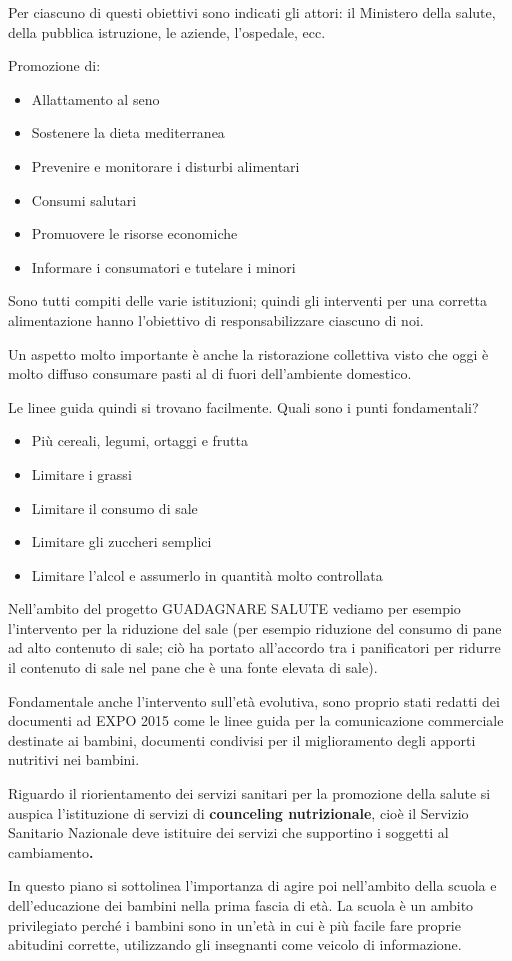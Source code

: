 Per ciascuno di questi obiettivi sono indicati gli attori: il Ministero
della salute, della pubblica istruzione, le aziende, l'ospedale, ecc.

Promozione di:

\begin{itemize}
\item
  Allattamento al seno
\item
  Sostenere la dieta mediterranea
\item
  Prevenire e monitorare i disturbi alimentari
\item
  Consumi salutari
\item
  Promuovere le risorse economiche
\item
  Informare i consumatori e tutelare i minori
\end{itemize}

Sono tutti compiti delle varie istituzioni; quindi gli interventi per
una corretta alimentazione hanno l'obiettivo di responsabilizzare
ciascuno di noi.

Un aspetto molto importante è anche la ristorazione collettiva visto che
oggi è molto diffuso consumare pasti al di fuori dell'ambiente
domestico.

Le linee guida quindi si trovano facilmente. Quali sono i punti
fondamentali?

\begin{itemize}
\item
  Più cereali, legumi, ortaggi e frutta
\item
  Limitare i grassi
\item
  Limitare il consumo di sale
\item
  Limitare gli zuccheri semplici
\item
  Limitare l'alcol e assumerlo in quantità molto controllata
\end{itemize}

Nell'ambito del progetto GUADAGNARE SALUTE vediamo per esempio
l'intervento per la riduzione del sale (per esempio riduzione del
consumo di pane ad alto contenuto di sale; ciò ha portato all'accordo
tra i panificatori per ridurre il contenuto di sale nel pane che è una
fonte elevata di sale).

Fondamentale anche l'intervento sull'età evolutiva, sono proprio stati
redatti dei documenti ad EXPO 2015 come le linee guida per la
comunicazione commerciale destinate ai bambini, documenti condivisi per
il miglioramento degli apporti nutritivi nei bambini.

Riguardo il riorientamento dei servizi sanitari per la promozione della
salute si auspica l'istituzione di servizi di \textbf{counceling
nutrizionale}, cioè il Servizio Sanitario Nazionale deve istituire dei
servizi che supportino i soggetti al cambiamento\textbf{.}

In questo piano si sottolinea l'importanza di agire poi nell'ambito
della scuola e dell'educazione dei bambini nella prima fascia di età. La
scuola è un ambito privilegiato perché i bambini sono in un'età in cui è
più facile fare proprie abitudini corrette, utilizzando gli insegnanti
come veicolo di informazione.
